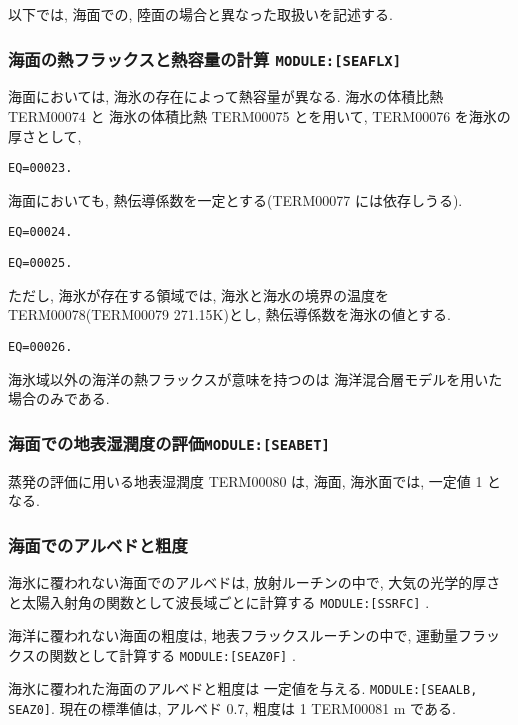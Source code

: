 \bigskip
以下では, 海面での, 陸面の場合と異なった取扱いを記述する.
\bigskip

\subsubsection{海面の熱フラックスと熱容量の計算 \texttt{MODULE:[SEAFLX]}}

海面においては, 海氷の存在によって熱容量が異なる.
海水の体積比熱 TERM00074 と
海氷の体積比熱 TERM00075 とを用いて, TERM00076 を海氷の厚さとして,
\begin{verbatim}
EQ=00023.
\end{verbatim}

海面においても, 熱伝導係数を一定とする(TERM00077 には依存しうる).
\begin{verbatim}
EQ=00024.
\end{verbatim}
\begin{verbatim}
EQ=00025.
\end{verbatim}

ただし, 海氷が存在する領域では, 
海氷と海水の境界の温度を TERM00078(TERM00079 271.15K)とし,
熱伝導係数を海氷の値とする.
\begin{verbatim}
EQ=00026.
\end{verbatim}

海氷域以外の海洋の熱フラックスが意味を持つのは
海洋混合層モデルを用いた場合のみである.

\subsubsection{海面での地表湿潤度の評価\texttt{MODULE:[SEABET]}}

蒸発の評価に用いる地表湿潤度 TERM00080 は,
海面, 海氷面では, 一定値 1 となる.

\subsubsection{海面でのアルベドと粗度}


海氷に覆われない海面でのアルベドは, 放射ルーチンの中で,
大気の光学的厚さと太陽入射角の関数として波長域ごとに計算する
\texttt{MODULE:[SSRFC]} .

海洋に覆われない海面の粗度は, 地表フラックスルーチンの中で,
運動量フラックスの関数として計算する
\texttt{MODULE:[SEAZ0F]} .

海氷に覆われた海面のアルベドと粗度は
一定値を与える.
\texttt{MODULE:[SEAALB, SEAZ0]}.
現在の標準値は, アルベド 0.7, 
粗度は 1 TERM00081 m である.

